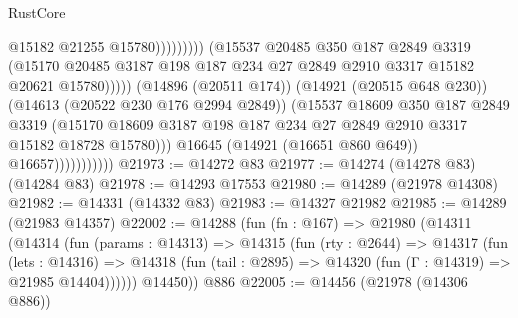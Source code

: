 \begin{lexlean}{RustCore}
\begin{coremodule}
                                                    @15182
                                                    @21255
                                                    @15780)))))))))
                                  (@15537
                                    @20485
                                    @350
                                    @187
                                    @2849
                                    @3319
                                    (@15170
                                      @20485
                                      @3187
                                      @198
                                      @187
                                      @234
                                      @27
                                      @2849
                                      @2910
                                      @3317
                                      @15182
                                      @20621
                                      @15780)))))
                            (@14896 (@20511 @174))
                            (@14921 (@20515 @648 @230))
                            (@14613 (@20522 @230 @176 @2994 @2849))
                            (@15537
                              @18609
                              @350
                              @187
                              @2849
                              @3319
                              (@15170
                                @18609
                                @3187
                                @198
                                @187
                                @234
                                @27
                                @2849
                                @2910
                                @3317
                                @15182
                                @18728
                                @15780)))
                          @16645
                          (@14921 (@16651 @860 @649))
                          @16657)))))))))))
@21973 := @14272 @83
@21977 := @14274 (@14278 @83) (@14284 @83)
@21978 := @14293 @17553
@21980 := @14289 (@21978 @14308)
@21982 := @14331 (@14332 @83)
@21983 := @14327 @21982
@21985 := @14289 (@21983 @14357)
@22002 := @14288
    (fun (fn : @167) =>
    @21980
      (@14311
        (@14314
          (fun (params : @14313) =>
          @14315
            (fun (rty : @2644) =>
            @14317
              (fun (lets : @14316) =>
              @14318 (fun (tail : @2895) => @14320 (fun (Γ : @14319) => @21985 @14404))))))
        @14450))
    @886
@22005 := @14456 (@21978 (@14306 @886))

\end{coremodule}
\end{lexlean}
